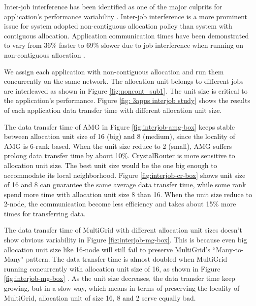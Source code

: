 \documentclass[conference]{IEEEtran}
\begin{document}
Inter-job interference has been identified as one of the major culprits for application's performance variability \cite{abhinav-sc13}\cite{skinner}\cite{rosenthal}. Inter-job interference is a more prominent issue for system adopted non-contiguous allocation policy than system with contiguous allocation. Application communication times have been demonstrated to vary from 36\% faster to 69\% slower due to job interference when running on non-contiguous allocation \cite{abhinav-sc13}.

We assign each application with non-contiguous allocation and run them concurrently on the same network. The allocation unit belongs to different jobs are interleaved as shown in Figure \ref{fig:noncont_sub1}. The unit size is critical to the application's performance. Figure \ref{fig: 3apps interjob study} shows the results of each application data transfer time with different allocation unit size. 

The data transfer time of AMG in Figure \ref{fig:interjob-amg-box} keeps stable between allocation unit size of 16 (big) and 8 (medium), since the locality of AMG is 6-rank based. When the unit size reduce to 2 (small), AMG suffers prolong data transfer time by about 10\%. CrystalRouter is more sensitive to allocation unit size. The best unit size would be the one big enough to accommodate its local neighborhood. Figure \ref{fig:interjob-cr-box} shows unit size of 16 and 8 can guarantee the same average data transfer time, while some rank spend more time with allocation unit size 8 than 16. When the unit size reduce to 2-node, the communication become less efficiency and takes about 15\% more times for transferring data. 

The data transfer time of MultiGrid with different allocation unit sizes doesn't show obvious variability in Figure \ref{fig:interjob-mg-box}. This is because even big allocation unit size like 16-node will still fail to preserve MultiGrid's ``Many-to-Many" pattern. The data transfer time is almost doubled when MultiGrid running concurrently with allocation unit size of 16, as shown in Figure \ref{fig:interjob-mg-box} . As the unit size decreases, the data transfer time keep growing, but in a slow way, which means in terms of preserving the locality of MultiGrid, allocation unit of size 16, 8 and 2 serve equally bad.
\end{document}
